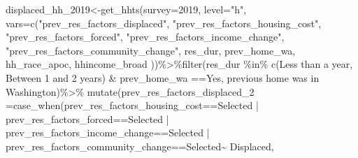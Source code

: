 \documentclass[
]{article}
\newenvironment{Shaded}{\begin{snugshade}}{\end{snugshade}}
\newcommand{\AttributeTok}[1]{\textcolor[rgb]{0.77,0.63,0.00}{#1}}
\newcommand{\FunctionTok}[1]{\textcolor[rgb]{0.00,0.00,0.00}{#1}}
\newcommand{\NormalTok}[1]{#1}
\newcommand{\OtherTok}[1]{\textcolor[rgb]{0.56,0.35,0.01}{#1}}
\newcommand{\SpecialCharTok}[1]{\textcolor[rgb]{0.00,0.00,0.00}{#1}}
\newcommand{\StringTok}[1]{\textcolor[rgb]{0.31,0.60,0.02}{#1}}
\begin{document}
\begin{Shaded}
\begin{Highlighting}[]
\NormalTok{displaced\_hh\_2019}\OtherTok{\textless{}{-}}\FunctionTok{get\_hhts}\NormalTok{(}\AttributeTok{survey=}\StringTok{\textquotesingle{}2019\textquotesingle{}}\NormalTok{, }\AttributeTok{level=}\StringTok{"h"}\NormalTok{, }\AttributeTok{vars=}\FunctionTok{c}\NormalTok{(}\StringTok{"prev\_res\_factors\_displaced"}\NormalTok{, }\StringTok{"prev\_res\_factors\_housing\_cost"}\NormalTok{, }\StringTok{"prev\_res\_factors\_forced"}\NormalTok{, }\StringTok{"prev\_res\_factors\_income\_change"}\NormalTok{, }\StringTok{"prev\_res\_factors\_community\_change"}\NormalTok{, }\StringTok{\textquotesingle{}res\_dur\textquotesingle{}}\NormalTok{, }\StringTok{\textquotesingle{}prev\_home\_wa\textquotesingle{}}\NormalTok{, }\StringTok{\textquotesingle{}hh\_race\_apoc\textquotesingle{}}\NormalTok{, }\StringTok{\textquotesingle{}hhincome\_broad\textquotesingle{}}\NormalTok{ ))}\SpecialCharTok{\%\textgreater{}\%}\FunctionTok{filter}\NormalTok{(res\_dur }\SpecialCharTok{\%in\%} \FunctionTok{c}\NormalTok{(}\StringTok{\textquotesingle{}Less than a year\textquotesingle{}}\NormalTok{, }\StringTok{\textquotesingle{}  Between 1 and 2 years\textquotesingle{}}\NormalTok{) }\SpecialCharTok{\&}\NormalTok{ prev\_home\_wa }\SpecialCharTok{==}\StringTok{\textquotesingle{}Yes, previous home was in Washington\textquotesingle{}}\NormalTok{)}\SpecialCharTok{\%\textgreater{}\%}
  \FunctionTok{mutate}\NormalTok{(}\AttributeTok{prev\_res\_factors\_displaced\_2 =}\FunctionTok{case\_when}\NormalTok{(prev\_res\_factors\_housing\_cost}\SpecialCharTok{==}\StringTok{\textquotesingle{}Selected\textquotesingle{}} \SpecialCharTok{|}\NormalTok{                                                 prev\_res\_factors\_forced}\SpecialCharTok{==}\StringTok{\textquotesingle{}Selected\textquotesingle{}} \SpecialCharTok{|}\NormalTok{                                                  prev\_res\_factors\_income\_change}\SpecialCharTok{==}\StringTok{\textquotesingle{}Selected\textquotesingle{}} \SpecialCharTok{|}\NormalTok{                prev\_res\_factors\_community\_change}\SpecialCharTok{==}\StringTok{\textquotesingle{}Selected\textquotesingle{}}\SpecialCharTok{\textasciitilde{}} \StringTok{\textquotesingle{}Displaced\textquotesingle{}}\NormalTok{, }

\end{Highlighting}
\end{Shaded}
\end{document}
